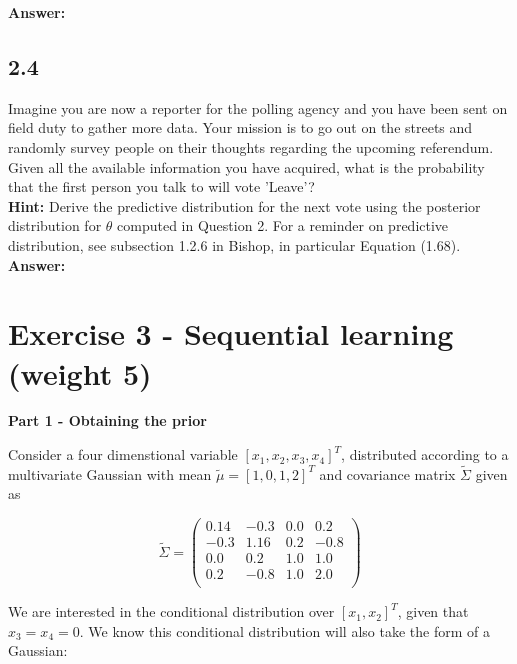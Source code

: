 \documentclass[a4paper]{article}
\begin{document}
\textbf{Answer:}\\






\subsection*{2.4}

Imagine you are now a reporter for the polling agency and you have been sent on field duty to gather more data. Your mission is to go out on the streets and randomly survey people on their thoughts regarding the upcoming referendum. Given all the available information you have acquired, what is the probability that the first person you talk to will vote 'Leave'?\\

\textbf{Hint:} Derive the predictive distribution for the next vote using the posterior distribution for $\theta$ computed in Question 2. For a reminder on predictive distribution, see subsection 1.2.6 in Bishop, in particular Equation (1.68).\\


\textbf{Answer:}\\





\section*{Exercise 3 - Sequential learning (weight 5)}


\textbf{Part 1 - Obtaining the prior}

Consider a four dimenstional variable $[x_1, x_2, x_3, x_4]^T$, distributed according to a multivariate Gaussian with mean $\tilde{\mu} = [1,0,1,2]^T$ and covariance matrix $\tilde{\Sigma}$ given as

	
\[ \tilde{\Sigma} = 
	\left(
	\begin{array}{cc|cc}
	0.14 & -0.3 & 0.0 & 0.2 \\
	-0.3 & 1.16 & 0.2 & -0.8 \\
	\hline
	0.0 & 0.2 & 1.0 & 1.0 \\
	0.2 & -0.8 & 1.0 & 2.0 \\	
	\end{array}
	\right)
\]	

We are interested in the conditional distribution over $[x_1,x_2]^T$, given that $x_3 = x_4 = 0$. We know this conditional distribution will also take the form of a Gaussian:
\end{document}
